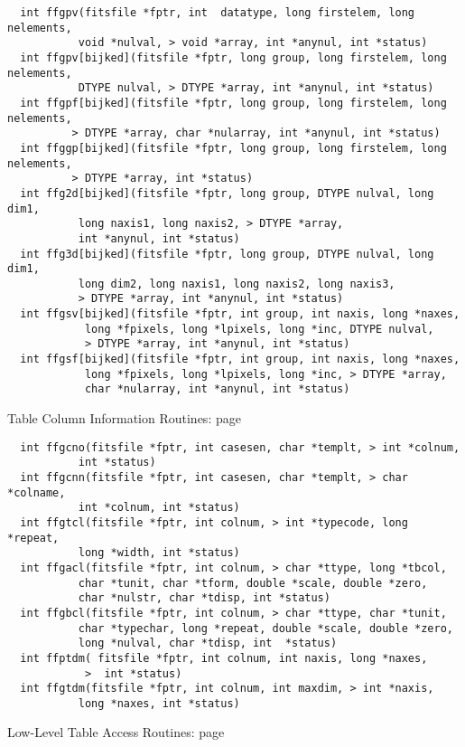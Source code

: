 \begin{verbatim}
  int ffgpv(fitsfile *fptr, int  datatype, long firstelem, long nelements,
           void *nulval, > void *array, int *anynul, int *status)
  int ffgpv[bijked](fitsfile *fptr, long group, long firstelem, long nelements,
           DTYPE nulval, > DTYPE *array, int *anynul, int *status)
  int ffgpf[bijked](fitsfile *fptr, long group, long firstelem, long nelements,
          > DTYPE *array, char *nularray, int *anynul, int *status)
  int ffggp[bijked](fitsfile *fptr, long group, long firstelem, long nelements,
          > DTYPE *array, int *status)
  int ffg2d[bijked](fitsfile *fptr, long group, DTYPE nulval, long dim1,
           long naxis1, long naxis2, > DTYPE *array,
           int *anynul, int *status)
  int ffg3d[bijked](fitsfile *fptr, long group, DTYPE nulval, long dim1,
           long dim2, long naxis1, long naxis2, long naxis3,
           > DTYPE *array, int *anynul, int *status)
  int ffgsv[bijked](fitsfile *fptr, int group, int naxis, long *naxes,
            long *fpixels, long *lpixels, long *inc, DTYPE nulval,
            > DTYPE *array, int *anynul, int *status)
  int ffgsf[bijked](fitsfile *fptr, int group, int naxis, long *naxes,
            long *fpixels, long *lpixels, long *inc, > DTYPE *array,
            char *nularray, int *anynul, int *status)
\end{verbatim}
 Table Column Information Routines: page~\pageref{FFGCNO}

\begin{verbatim}
  int ffgcno(fitsfile *fptr, int casesen, char *templt, > int *colnum,
           int *status)
  int ffgcnn(fitsfile *fptr, int casesen, char *templt, > char *colname,
           int *colnum, int *status)
  int ffgtcl(fitsfile *fptr, int colnum, > int *typecode, long *repeat,
           long *width, int *status)
  int ffgacl(fitsfile *fptr, int colnum, > char *ttype, long *tbcol,
           char *tunit, char *tform, double *scale, double *zero,
           char *nulstr, char *tdisp, int *status)
  int ffgbcl(fitsfile *fptr, int colnum, > char *ttype, char *tunit,
           char *typechar, long *repeat, double *scale, double *zero,
           long *nulval, char *tdisp, int  *status)
  int ffptdm( fitsfile *fptr, int colnum, int naxis, long *naxes,
            >  int *status)
  int ffgtdm(fitsfile *fptr, int colnum, int maxdim, > int *naxis,
           long *naxes, int *status)
\end{verbatim}
 Low-Level Table Access Routines: page~\pageref{FFGTBB}

